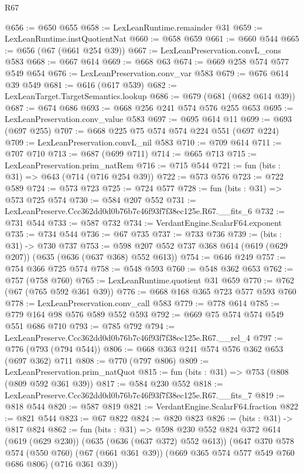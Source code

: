 \begin{lexlean}{R67}
\begin{coremodule}
@656 := @650 @655
@658 := LexLeanRuntime.remainder @31
@659 := LexLeanRuntime.instQuotientNat
@660 := @658 @659
@661 := @660 @544
@665 := @656 (@67 (@661 @254 @39))
@667 := LexLeanPreservation.convL_cons @583
@668 := @667 @614
@669 := @668 @63
@674 := @669 @258 @574 @577 @549 @654
@676 := LexLeanPreservation.conv_var @583
@679 := @676 @614 @39 @549
@681 := @616 (@617 @539)
@682 := LexLeanTarget.TargetSemantics.lookup
@686 := @679 (@681 (@682 @614 @39))
@687 := @674 @686
@693 := @668 @256 @241 @574 @576 @255 @653
@695 := LexLeanPreservation.conv_value @583
@697 := @695 @614 @11
@699 := @693 (@697 @255)
@707 := @668 @225 @75 @574 @574 @224 @551 (@697 @224)
@709 := LexLeanPreservation.convL_nil @583
@710 := @709 @614
@711 := @707 @710
@713 := @687 (@699 @711)
@714 := @665 @713
@715 := LexLeanPreservation.prim_natRem
@716 := @715 @544
@721 := fun (bits : @31) => @643 (@714 (@716 @254 @39))
@722 := @573 @576
@723 := @722 @589
@724 := @573 @723
@725 := @724 @577
@728 := fun (bits : @31) => @573 @725 @574
@730 := @584 @207 @552
@731 := LexLeanPreserve.Ccc362dd0d0b76b7c46f93f7f38ec125e.R67.__fits_6
@732 := @731 @544
@733 := @587 @732
@734 := VerdantEngine.ScalarF64.exponent
@735 := @734 @544
@736 := @67 @735
@737 := @733 @736
@739 := (bits : @31) -> @730 @737
@753 := @598 @207 @552 @737 @368 @614 (@619 (@629 @207)) (@635 (@636 (@637 @368) @552 @613))
@754 := @646 @249
@757 := @754 @366 @725 @574
@758 := @548 @593
@760 := @548 @362 @653
@762 := @757 (@758 @760)
@765 := LexLeanRuntime.quotient @31 @659
@770 := @762 (@67 (@765 @592 @361 @39))
@776 := @668 @168 @365 @723 @577 @593 @760
@778 := LexLeanPreservation.conv_call @583
@779 := @778 @614
@785 := @779 @164 @98 @576 @589 @552 @593
@792 := @669 @75 @574 @574 @549 @551 @686 @710
@793 := @785 @792
@794 := LexLeanPreserve.Ccc362dd0d0b76b7c46f93f7f38ec125e.R67.__rel_4
@797 := @776 (@793 (@794 @544))
@806 := @668 @363 @241 @574 @576 @362 @653 (@697 @362) @711
@808 := @770 (@797 @806)
@809 := LexLeanPreservation.prim_natQuot
@815 := fun (bits : @31) => @753 (@808 (@809 @592 @361 @39))
@817 := @584 @230 @552
@818 := LexLeanPreserve.Ccc362dd0d0b76b7c46f93f7f38ec125e.R67.__fits_7
@819 := @818 @544
@820 := @587 @819
@821 := VerdantEngine.ScalarF64.fraction
@822 := @821 @544
@823 := @67 @822
@824 := @820 @823
@826 := (bits : @31) -> @817 @824
@862 := fun (bits : @31) =>
  @598
    @230
    @552
    @824
    @372
    @614
    (@619 (@629 @230))
    (@635 (@636 (@637 @372) @552 @613))
    (@647
      @370
      @578
      @574
      (@550 @760)
      (@67 (@661 @361 @39))
      (@669 @365 @574 @577 @549 @760 @686 @806)
      (@716 @361 @39))

\end{coremodule}
\end{lexlean}
